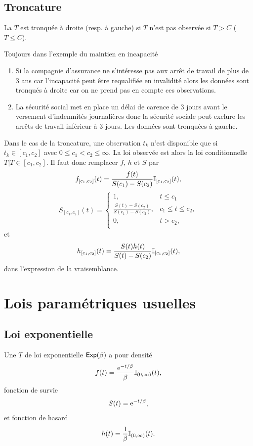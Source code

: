 \subsection{Troncature}\label{ssec:censureIII}
\begin{definition}\label{def:censure_tronquature}

La \va $T$ est tronquée à droite (resp. à gauche) si $T$ n'est pas observée si
$T> C$ ( $T\leq C$).
\end{definition}
\begin{ex}
Toujours dans l'exemple du maintien en incapacité
\begin{enumerate}
\item Si la compagnie d'assurance ne s'intéresse pas aux arrêt de travail de plus de $3$ ans car l'incapacité peut être requalifiée en invalidité alors les données sont tronqués à droite car on ne prend pas en compte ces observations. 
\item La sécurité social met en place un délai de carence de $3$ jours avant le versement d'indemnités journalières donc la sécurité sociale peut exclure les arrêts de travail inférieur à $3$ jours. Les données sont tronquées à gauche.
\end{enumerate}
\end{ex}
Dans le cas de la troncature, une observation $t_k$ n'est disponible que si $t_k\in[c_1,c_2]$ avec $0\leq c_1< c_2\leq \infty$. La loi observée est alors la loi conditionnelle $T|T\in[c_1,c_2]$. Il faut donc remplacer $f$, $h$ et $S$ par 
$$
f_{[c_1,c_2]}(t) = \frac{f(t)}{S(c_1) - S(c_2)}\mathbb{I}_{[c_1,c_2]}(t),
$$
$$
S_{[c_1,c_2]}(t) = \begin{cases}
1,&t\leq c_1\\
\frac{S(t)-S(c_2)}{S(c_1)-S(c_2)},&c_1\leq t\leq c_2,\\
0,&t> c_2, \\
\end{cases}
$$
et
$$
h_{[c_1,c_2]}(t) = \frac{S(t)h(t)}{S(t) - S(c_2)}\mathbb{I}_{[c_1,c_2]}(t),
$$
dans l'expression de la vraisemblance.
\section{Lois paramétriques usuelles}\label{sec:common_parametric_model}
\subsection{Loi exponentielle}\label{ssec:exp}

Une \va $T$ de loi exponentielle $\mathsf{Exp}(\beta)$ a pour densité
$$
f(t) = \frac{\mathrm{e}^{- t/\beta}}{\beta}\mathbb{I}_{(0,\infty)}(t),
$$ 
fonction de survie
$$
S(t) = \mathrm{e}^{- t/\beta},
$$
et fonction de hasard
$$
h(t) = \frac{1}{\beta}\mathbb{I}_{(0,\infty)}(t).
$$

